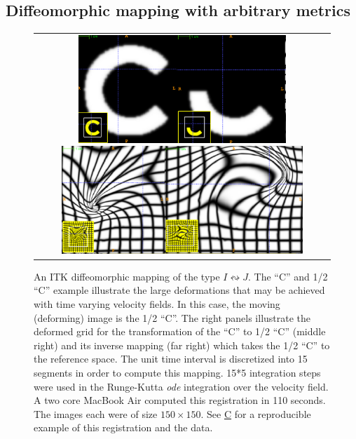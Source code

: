 \documentclass{frontiersSCNS}
\begin{document}
\subsection{Diffeomorphic mapping with arbitrary metrics}
\begin{figure}[t]
\begin{center}
\begin{tabular}{c}
\includegraphics[height=1.6in]{figs/c_chalf.pdf}
\includegraphics[height=1.6in]{figs/c_half_c_grids.pdf}
\end{tabular}
\caption{\baselineskip 12pt \small An ITK diffeomorphic mapping of the
  type $I \leftrightsquigarrow J $.  The 
``C'' and 1/2 ``C'' example illustrate the large deformations that may
be achieved with time varying velocity fields.  In this case, the moving (deforming) image is
the 1/2 ``C''.  The right panels illustrate the deformed grid for the
transformation of the ``C'' to 1/2 ``C'' (middle right) and its
inverse mapping (far right) which takes the 1/2 ``C'' to the reference
space.  The unit time interval is discretized into 15 segments in
order to compute this mapping.  15*5 integration steps were used in
the Runge-Kutta {\em ode} integration over the velocity field.  A two
core MacBook Air computed this registration in 110 seconds.  The images
each were of size $150 \times 150$.  See
\href{http://stnava.github.io/C/}{C} for a reproducible example of
this registration and the data.}
\label{fig:chalf}
\end{center}
\end{figure}
\end{document}
